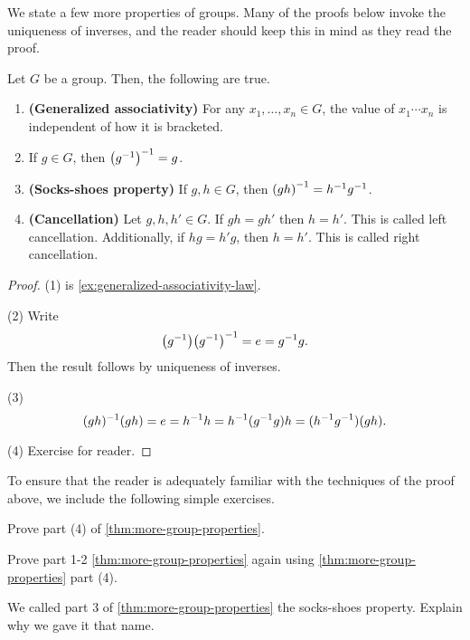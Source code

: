 \documentclass[./algebra-notes.tex]{subfiles}
\begin{document}
We state a few more properties of groups. Many of the proofs below invoke the
uniqueness of inverses, and the reader should keep this in mind as they read the
proof.
\begin{theorem}
\label{thm:more-group-properties}
    Let $G$ be a group. Then, the following are true.
    \begin{enumerate}
        \item \textbf{(Generalized associativity)} For any $x_1, \dots, x_n \in
        G$, the value of $x_1 \cdots x_n$ is independent of how it is bracketed. 
        \item If $g \in G$, then $\paren{g\inv}\inv = g$.
        \item \textbf{(Socks-shoes property)} If $g, h \in G$, then
        $\paren{gh}\inv = h \inv g \inv$.
        \item \textbf{(Cancellation)} Let $g, h, h' \in G$. If $gh = gh'$ then
        $h = h'$. This is called left cancellation. Additionally, if $hg = h'g$,
        then $h = h'$. This is called right cancellation.
    \end{enumerate}
\end{theorem}
\begin{proof}
    (1) is \cref{ex:generalized-associativity-law}. 

    (2)
    Write
    \[
        \paren{g\inv} \paren{g\inv}\inv = e = g\inv g. 
    \]
    Then the result follows by uniqueness of inverses.

    (3)
    \[
        (gh)^{-1} (gh) = e = h^{-1} h = h ^{-1} (g^{-1} g) h = (h^{-1} g^{-1}) (gh).
    \]

    (4) Exercise for reader.
\end{proof}

To ensure that the reader is adequately familiar with the techniques of the proof above,
we include the following simple exercises. 
\begin{exercise}
\label{exercise:group-cancellation-law}
Prove part (4) of \cref{thm:more-group-properties}.
\end{exercise}

\begin{exercise}
    Prove part 1-2 \cref{thm:more-group-properties} again using \cref{thm:more-group-properties} part (4).
\end{exercise}

\begin{exercise}
    We called part 3 of \cref{thm:more-group-properties} the socks-shoes
    property. Explain why we gave it that name. 
\end{exercise}
\end{document}
